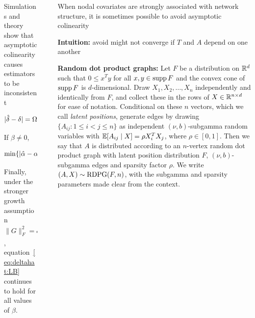 \documentclass[final]{beamer}
\newlength{\sepwidth}
\newlength{\colwidth}
\newcommand{\separatorcolumn}{\begin{column}{\sepwidth}\end{column}}
\begin{document}
\begin{frame}[t]
\begin{columns}[t]
\begin{column}{\colwidth}
\begin{block}{Simulations and theory show that asymptotic colinearity causes estimators to be inconsistent}
\begin{equation}
                    | \deltahat - \delta | = \Omegap{ \frac{1}{\|G\|_F} }.
                \end{equation}
                If $\beta \neq 0$,
                \begin{equation*}
                    \min\{ |\alphahat-\alpha|, |\betahat-\beta| \}
                    = \Omegap{ \frac{1}{\|G\|_F} }.
                \end{equation*}
                Finally, under the stronger growth assumption $\|G\|_F^2 = o( \sqrt{n} )$, equation~\eqref{eq:deltahat:LB} continues to hold for all values of $\beta$.
            \end{block}
        \end{column}

        \separatorcolumn

        \begin{column}{\colwidth}
            \begin{block}{When nodal covariates are strongly associated with network structure, it is sometimes possible to avoid asymptotic colinearity}

                \textbf{Intuition:} avoid might not converge if $T$ and $A$ depend on one another

                \textbf{Random dot product graphs:} Let $F$ be a distribution on $\mathbb{R}^d$ such that $0 \le x^T y$ for all $x,y \in \operatorname*{supp} F$ and the convex cone of $\operatorname*{supp} F$ is $d$-dimensional. Draw $X_1, X_2, \dots, X_n$ independently and identically from $F$, and collect these in the rows of $X \in \mathbb{R}^{n \times d}$ for ease of notation. Conditional on these $n$ vectors, which we call {\em latent positions}, generate edges by drawing $\{ A_{ij} : 1 \le i < j \le n \}$ as independent $(\nu,b)$-subgamma random variables with $\mathbb{E}[ A_{ij} \mid X ] = \rho X_i^T X_j$, where $\rho \in [0,1]$. Then we say that $A$ is distributed according to an $n$-vertex random dot product graph with latent position distribution $F$, $(\nu,b)$-subgamma edges and sparsity factor $\rho$. We write $(A,X) \sim \operatorname{RDPG}( F, n)$, with the subgamma and sparsity parameters made clear from the context.


\end{block}
\end{column}
\end{columns}
\end{frame}
\end{document}
